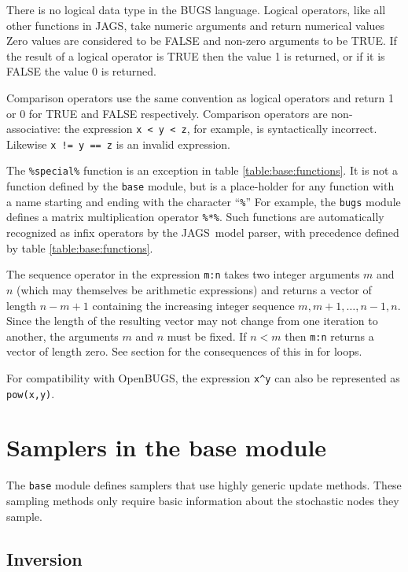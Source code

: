 \documentclass[11pt, a4paper, titlepage]{report}
\newcommand{\JAGS}{\textsf{JAGS}}
\begin{document}
There is no logical data type in the BUGS language.  Logical
operators, like all other functions in JAGS, take numeric arguments
and return numerical values Zero values are considered to be FALSE and
non-zero arguments to be TRUE. If the result of a logical operator is
TRUE then the value 1 is returned, or if it is FALSE the value 0 is
returned.

Comparison operators use the same convention as logical operators and
return 1 or 0 for TRUE and FALSE respectively.  Comparison operators
are non-associative: the expression \verb+x < y < z+, for example, is
syntactically incorrect. Likewise \verb+x != y == z+ is an invalid
expression.

The \verb+%special%+ function is an exception in table
\ref{table:base:functions}. It is not a function defined by the
\verb+base+ module, but is a place-holder for any function with a name
starting and ending with the character ``\verb+%+'' For example, the
\texttt{bugs} module defines a matrix multiplication operator
\verb+%*%+. Such functions are automatically recognized as infix
operators by the \JAGS\ model parser, with precedence defined by table
\ref{table:base:functions}.

The sequence operator in the expression \verb+m:n+ takes two integer
arguments $m$ and $n$ (which may themselves be arithmetic expressions)
and returns a vector of length $n - m + 1$ containing the increasing
integer sequence $m, m+1, \ldots, n-1, n$. Since the length of the
resulting vector may not change from one iteration to another, the
arguments $m$ and $n$ must be fixed.  If $n < m$ then \verb+m:n+
returns a vector of length zero. See section \label{section:forloops}
for the consequences of this in for loops.

For compatibility with OpenBUGS, the expression \verb+x^y+ can also be
represented as \texttt{pow(x,y)}.

\section{Samplers in the base module}

The \texttt{base} module defines samplers that use highly generic update
methods.  These sampling methods only require basic information about
the stochastic nodes they sample.  

\subsection{Inversion}
\end{document}
